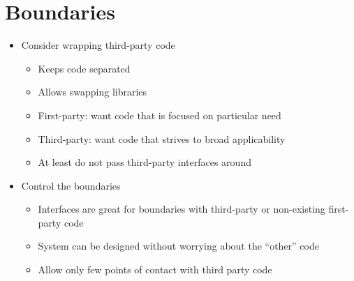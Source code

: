 \section{Boundaries}
\begin{itemize}
    \item Consider wrapping third-party code
    \begin{itemize}
        \item Keeps code separated
        \item Allows swapping libraries
        \item First-party: want code that is focused on particular need
        \item Third-party: want code that strives to broad applicability
        \item At least do not pass third-party interfaces around
    \end{itemize}
    \item Control the boundaries
    \begin{itemize}
        \item Interfaces are great for boundaries with third-party or non-existing first-party code
        \item System can be designed without worrying about the ``other'' code
        \item Allow only few points of contact with third party code
    \end{itemize}
\end{itemize}

